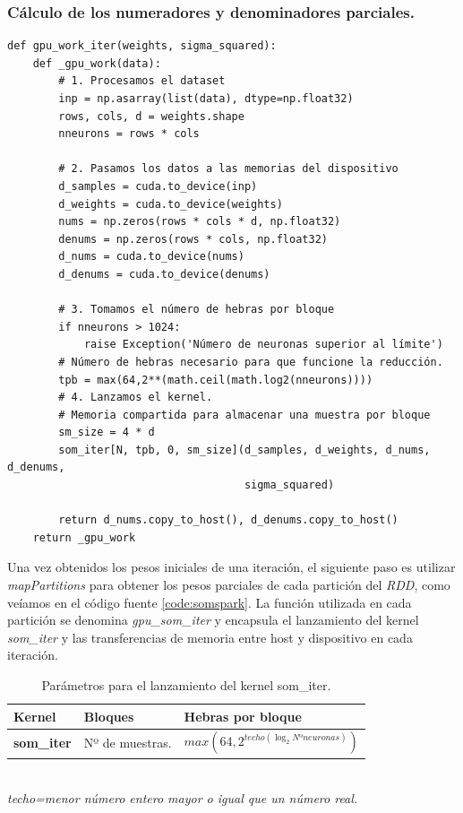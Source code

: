 \subsubsection{Cálculo de los numeradores y denominadores parciales.}
\begin{code}
\begin{verbatim}
def gpu_work_iter(weights, sigma_squared):
    def _gpu_work(data):
        # 1. Procesamos el dataset
        inp = np.asarray(list(data), dtype=np.float32)
        rows, cols, d = weights.shape
        nneurons = rows * cols
        
        # 2. Pasamos los datos a las memorias del dispositivo
        d_samples = cuda.to_device(inp)
        d_weights = cuda.to_device(weights)
        nums = np.zeros(rows * cols * d, np.float32)
        denums = np.zeros(rows * cols, np.float32)
        d_nums = cuda.to_device(nums)
        d_denums = cuda.to_device(denums)
        
        # 3. Tomamos el número de hebras por bloque
        if nneurons > 1024:
            raise Exception('Número de neuronas superior al límite')
        # Número de hebras necesario para que funcione la reducción.
        tpb = max(64,2**(math.ceil(math.log2(nneurons))))
        # 4. Lanzamos el kernel.
        # Memoria compartida para almacenar una muestra por bloque
        sm_size = 4 * d
        som_iter[N, tpb, 0, sm_size](d_samples, d_weights, d_nums, d_denums,
                                     sigma_squared)
        
        return d_nums.copy_to_host(), d_denums.copy_to_host()
    return _gpu_work
\end{verbatim}
\label{code:somencapsulado}
\end{code}
Una vez obtenidos los pesos iniciales de una iteración, el siguiente paso es utilizar \textit{mapPartitions} para obtener los pesos parciales de cada partición del \textit{RDD}, como veíamos en el código fuente \ref{code:somspark}. La función utilizada en cada partición se denomina \textit{gpu\_som\_iter} y encapsula el lanzamiento del kernel \textit{som\_iter} y las transferencias de memoria entre host y dispositivo en cada iteración.\\

\begin{table}[ht]
\centering
\begin{tabular}{@{}lll@{}}

\toprule
\textbf{Kernel}        & \textbf{Bloques}                                 & \textbf{Hebras por bloque}                                                                       \\ \midrule
\textbf{som\_iter} &   Nº de muestras. & $max(64,2^{techo(\log_2{Nº neuronas})})$ \\ \bottomrule
\end{tabular}
\textit{\\techo=menor número entero mayor o igual que un número real.}
\caption{Parámetros para el lanzamiento del kernel som\_iter.}
\label{tab:iterkernel}
\end{table}

